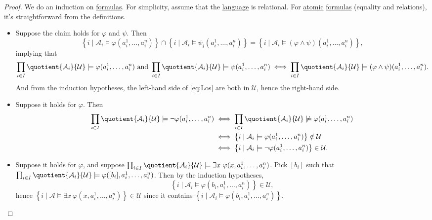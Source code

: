 \begin{proof}
	We do an induction on \hyperref[def:formula]{formulas}. For simplicity, assume that the \hyperref[def:language]{language} is relational. For \hyperref[not:atomic]{atomic} \hyperref[def:formula]{formulas} (equality and relations), it's straightforward from the definitions.
	\begin{itemize}
		\item Suppose the claim holds for \(\varphi \) and \(\psi \). Then
		      \begin{equation}\label{eq:Los}
			      \left\{ i \mid \mathcal{A} _i \models \varphi (a_i^1, \dots , a_i^n) \right\}
			      \cap \left\{ i \mid \mathcal{A} _i \models \psi _i(a_i^1, \dots , a_i^n) \right\}
			      = \left\{ i \mid \mathcal{A} _i \models (\varphi \land \psi )(a_i^1, \dots , a_i^n) \right\},
		      \end{equation}
		      implying that
		      \[
			      \prod_{i\in I} \quotient{\mathcal{A} _i}{\mathcal{U} } \models \varphi (a_i^1, \dots , a_i^n)
			      \text{ and } \prod_{i\in I} \quotient{\mathcal{A} _i}{\mathcal{U} } \models \psi (a_i^1, \dots , a_i^n)
			      \iff \prod_{i\in I} \quotient{\mathcal{A} _i}{\mathcal{U} } \models (\varphi \land \psi )(a_i^1, \dots , a_i^n).
		      \]
		      And from the induction hypotheses, the left-hand side of \autoref{eq:Los} are both in \(\mathcal{U} \), hence the right-hand side.
		\item Suppose it holds for \(\varphi \). Then
		      \[
			      \begin{split}
				      \prod_{i\in I} \quotient{\mathcal{A}_i }{\mathcal{U} } \models \lnot \varphi (a_i^1, \dots , a_i^n)
				      &\iff \prod_{i\in I} \quotient{\mathcal{A}_i }{\mathcal{U} } \not \models \varphi (a_i^1, \dots , a_i^n)\\
				      &\iff \left\{ i \mid \mathcal{A} _i \models \varphi (a_i^1, \dots , a_i^n) \right\} \notin \mathcal{U} \\
				      &\iff \left\{ i \mid \mathcal{A} _i \models \lnot \varphi (a_i^1, \dots , a_i^n) \right\} \in \mathcal{U} .
			      \end{split}
		      \]
		\item Suppose it holds for \(\varphi \), and suppose \(\prod_{i\in I} \quotient{\mathcal{A}_i }{\mathcal{U} } \models \exists x\ \varphi (x, a_i^1, \dots , a_i^n)\). Pick \([b_i]\) such that \(\prod_{i\in I} \quotient{\mathcal{A}_i }{\mathcal{U} } \models \varphi ([b_i], a_i^1, \dots , a_i^n)\). Then by the induction hypotheses,
		      \[
			      \left\{ i \mid \mathcal{A} _i \models \varphi (b_i, a_i^1, \dots , a_i^n) \right\} \in \mathcal{U},
		      \]
		      hence \(\left\{ i \mid \mathcal{A} \models \exists x\ \varphi (x, a_i^1, \dots , a_i^n) \right\} \in \mathcal{U} \) since it contains \(\left\{ i \mid \mathcal{A} _i \models \varphi (b_i, a_i^1, \dots , a_i^n) \right\}\).


\end{itemize}
\end{proof}
